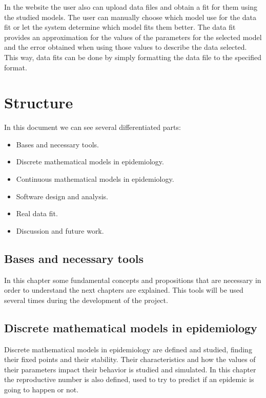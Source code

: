 In the website the user also can upload data files and obtain a fit for them using the studied models. The user can manually choose which model use for the data fit or let the system determine which model fits them better. The data fit provides an approximation for the values of the parameters for the selected model and the error obtained when using those values to describe the data selected. This way, data fits can be done by simply formatting the data file to the specified format.

\section*{Structure}

In this document we can see several differentiated parts:

\begin{itemize}
\item Bases and necessary tools.
\item Discrete mathematical models in epidemiology.
\item Continuous mathematical models in epidemiology.
\item Software design and analysis.
\item Real data fit.
\item Discussion and future work.
\end{itemize}

\subsection*{Bases and necessary tools}

In this chapter some fundamental concepts and propositions that are necessary in order to understand the next chapters are explained.  This tools will be used several times during the development of the project.

\subsection*{Discrete mathematical models in epidemiology}

Discrete mathematical models in epidemiology are defined and studied, finding their fixed points and their stability. Their characteristics and how the values of their parameters impact their behavior is studied and simulated. In this chapter the reproductive number is also defined, used to try to predict if an epidemic is going to happen or not.

